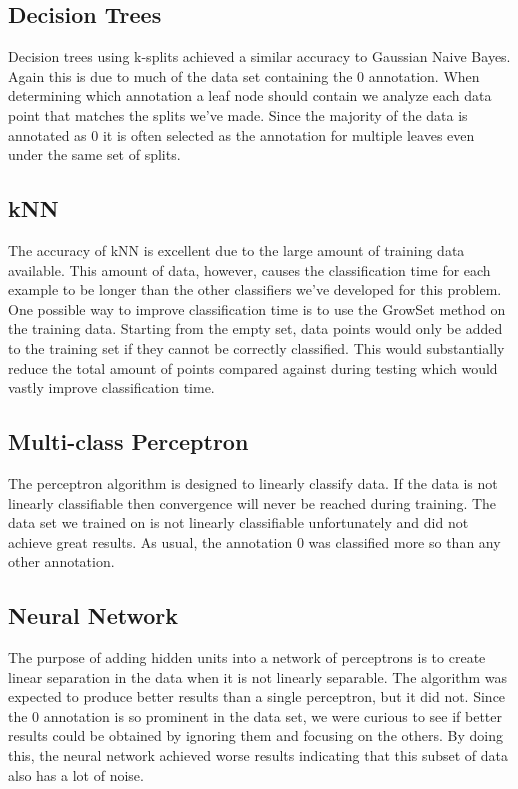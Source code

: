 \documentclass[twoside]{article}
\begin{document}
\begin{multicols}{2}
\subsection{Decision Trees}
Decision trees using k-splits achieved a similar accuracy to Gaussian Naive Bayes.  Again this is due to much of the data set containing the $0$ annotation.  When determining which annotation a leaf node should contain we analyze each data point that matches the splits we've made.  Since the majority of the data is annotated as $0$ it is often selected as the annotation for multiple leaves even under the same set of splits.

\subsection{kNN}
The accuracy of kNN is excellent due to the large amount of training data available. This amount of data, however, causes the classification time for each example to be longer than the other classifiers we've developed for this problem. One possible way to improve classification time is to use the GrowSet method on the training data.  Starting from the empty set, data points would only be added to the training set if they cannot be correctly classified.  This would substantially reduce the total amount of points compared against during testing which would vastly improve classification time.

\subsection{Multi-class Perceptron}
The perceptron algorithm is designed to linearly classify data.  If the data is not linearly classifiable then convergence will never be reached during training.  The data set we trained on is not linearly classifiable unfortunately and did not achieve great results.  As usual, the annotation $0$ was classified more so than any other annotation.

\subsection{Neural Network}
The purpose of adding hidden units into a network of perceptrons is to create linear separation in the data when it is not linearly separable.  The algorithm was expected to produce better results than a single perceptron, but it did not.  Since the $0$ annotation is so prominent in the data set, we were curious to see if better results could be obtained by ignoring them and focusing on the others.  By doing this, the neural network achieved worse results indicating that this subset of data also has a lot of noise.   


\end{multicols}
\end{document}
